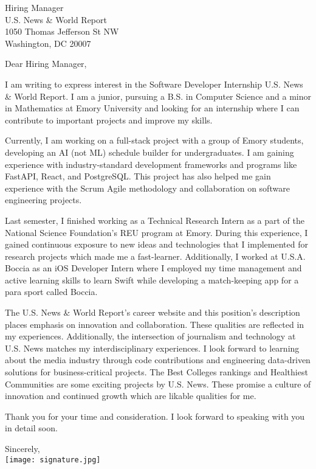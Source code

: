 \documentclass[letterpaper,12pt]{letter}
\date{}
\begin{document}
\begin{letter}{%
    Hiring Manager \\ 
	U.S. News \& World Report \\
	1050 Thomas Jefferson St NW \\
	Washington, DC 20007
}

\opening{Dear Hiring Manager,}

I am writing to express interest in the Software Developer Internship U.S. News \& World Report. I am a junior, pursuing 
a B.S. in Computer Science and a minor in Mathematics at Emory University and looking for an internship where I can 
contribute to important projects and improve my skills.

Currently, I am working on a full-stack project with a group of Emory students, 
developing an AI (not ML) schedule builder for undergraduates. I am gaining
experience with industry-standard development frameworks and programs like FastAPI, 
React, and PostgreSQL. This project has also helped me gain experience with the 
Scrum Agile methodology and collaboration on software engineering projects.

Last semester, I finished working as a Technical Research Intern as a part of the 
National Science Foundation's 
REU program at Emory. During this experience, I gained continuous exposure 
to new ideas and technologies that I implemented for research projects
which made me a fast-learner. Additionally, I worked at U.S.A. Boccia as an iOS Developer Intern 
where I employed my time management and active learning 
skills to learn Swift while developing a match-keeping app for a para sport 
called Boccia.

The U.S. News \& World Report's career website and this position's description 
places emphasis on innovation and collaboration. These qualities are reflected in 
my experiences. Additionally, the intersection 
of journalism and technology at U.S. News matches my interdisciplinary experiences.
I look forward to learning about the media industry through code contributions
and engineering data-driven solutions for business-critical projects. 
The Best Colleges rankings and Healthiest Communities are some exciting
projects by U.S. News. These promise a culture of innovation and continued growth 
which are likable qualities for me. 

Thank you for your time and consideration. I look forward to speaking with you in detail soon.

\closing{Sincerely, \\
\vspace{10pt}
\texttt{[image: signature.jpg]}}


\end{letter}

\end{document}
